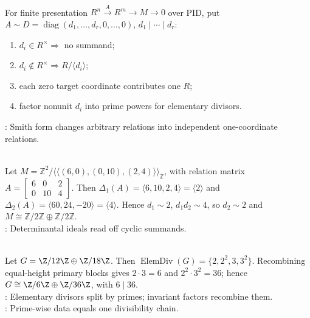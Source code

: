 \begin{method} \label{meth:smith-form-module-presentation} \\
For finite presentation $R^n\xrightarrow{A}R^m\to M\to0$ over PID, put $A\sim D=\operatorname{diag}(d_1,\ldots,d_r,0,\ldots,0)$, $d_1\mid\cdots\mid d_r$:
\begin{enumerate}[label=(\roman*)]
\setlength{\itemsep}{0pt}
\item $d_i\in R^\times\Longrightarrow$ no summand;
\item $d_i\notin R^\times\Longrightarrow R/\langle d_i\rangle$;
\item each zero target coordinate contributes one $R$;
\item factor nonunit $d_i$ into prime powers for elementary divisors.
\end{enumerate}
: Smith form changes arbitrary relations into independent one-coordinate relations.
\end{method}

\begin{example} \label{ex:smith-normal-form-abelian-group-decomposition} \\
Let $M=\mathbb{Z}^2/\langle\!\langle(6,0),(0,10),(2,4)\rangle\!\rangle_{\mathbb{Z}}$, with relation matrix $A=\begin{bmatrix}6&0&2\\0&10&4\end{bmatrix}$. Then $\Delta_1(A)=\langle6,10,2,4\rangle=\langle2\rangle$ and $\Delta_2(A)=\langle60,24,-20\rangle=\langle4\rangle$. Hence $d_1\sim2$, $d_1d_2\sim4$, so $d_2\sim2$ and $M\cong\mathbb{Z}/2\mathbb{Z}\oplus\mathbb{Z}/2\mathbb{Z}$.\\
: Determinantal ideals read off cyclic summands.
\end{example}

\begin{example} \label{ex:elementary-divisors-recombine-to-invariant-factors} \\
Let $G=\Z/12\Z\oplus\Z/18\Z$. Then $\operatorname{ElemDiv}(G)=\{2,2^2,3,3^2\}$. Recombining equal-height primary blocks gives $2\cdot3=6$ and $2^2\cdot3^2=36$; hence $G\cong\Z/6\Z\oplus\Z/36\Z$, with $6\mid36$.\\
: Elementary divisors split by primes; invariant factors recombine them.\\
: Prime-wise data equals one divisibility chain.
\end{example}
